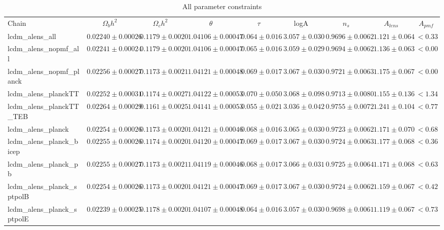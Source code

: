 \documentclass[preprint]{emulateapj}
\begin{document}
\begin{table*}[htb]
\begin{center}
\caption{\label{tab:param_all} All parameter constraints}
\tiny
\begin{tabular}{l || c c c c c c c | c}
Chain & $\Omega_b h^2$  & $\Omega_c h^2$  & $\theta$  & $\tau$  & logA  & $n_s$  & $A_{lens}$  & $A_{pmf}$ \\
lcdm\_alens\_all & $ 0.02240\pm  0.00026$ & $ 0.1179\pm  0.0020$ & $ 1.04106\pm  0.00047$ & $ 0.064\pm  0.016$ & $ 3.057\pm  0.030$ & $ 0.9696\pm  0.0062$ & $ 1.121 \pm  0.064$ & $< 0.33$ \\
lcdm\_alens\_nopmf\_all & $ 0.02241\pm  0.00024$ & $ 0.1179\pm  0.0020$ & $ 1.04106\pm  0.00047$ & $ 0.065\pm  0.016$ & $ 3.059\pm  0.029$ & $ 0.9694\pm  0.0062$ & $ 1.136 \pm  0.063$ & $< 0.00$ \\
lcdm\_alens\_nopmf\_planck & $ 0.02256\pm  0.00027$ & $ 0.1173\pm  0.0021$ & $ 1.04121\pm  0.00048$ & $ 0.069\pm  0.017$ & $ 3.067\pm  0.030$ & $ 0.9721\pm  0.0063$ & $ 1.175 \pm  0.067$ & $< 0.00$ \\
lcdm\_alens\_planckTT & $ 0.02252\pm  0.00031$ & $ 0.1174\pm  0.0027$ & $ 1.04122\pm  0.00053$ & $ 0.070\pm  0.050$ & $ 3.068\pm  0.098$ & $ 0.9713\pm  0.0080$ & $ 1.155 \pm  0.136$ & $< 1.34$ \\
lcdm\_alens\_planckTT\_TEB & $ 0.02264\pm  0.00029$ & $ 0.1161\pm  0.0025$ & $ 1.04141\pm  0.00053$ & $ 0.055\pm  0.021$ & $ 3.036\pm  0.042$ & $ 0.9755\pm  0.0072$ & $ 1.241 \pm  0.104$ & $< 0.77$ \\
lcdm\_alens\_planck & $ 0.02254\pm  0.00026$ & $ 0.1173\pm  0.0020$ & $ 1.04121\pm  0.00046$ & $ 0.068\pm  0.016$ & $ 3.065\pm  0.030$ & $ 0.9723\pm  0.0062$ & $ 1.171 \pm  0.070$ & $< 0.68$ \\
lcdm\_alens\_planck\_bicep & $ 0.02255\pm  0.00026$ & $ 0.1174\pm  0.0020$ & $ 1.04120\pm  0.00047$ & $ 0.069\pm  0.017$ & $ 3.067\pm  0.030$ & $ 0.9724\pm  0.0063$ & $ 1.177 \pm  0.068$ & $< 0.36$ \\
lcdm\_alens\_planck\_pb & $ 0.02255\pm  0.00027$ & $ 0.1173\pm  0.0021$ & $ 1.04119\pm  0.00046$ & $ 0.068\pm  0.017$ & $ 3.066\pm  0.031$ & $ 0.9725\pm  0.0064$ & $ 1.171 \pm  0.068$ & $< 0.63$ \\
lcdm\_alens\_planck\_sptpolB & $ 0.02254\pm  0.00026$ & $ 0.1173\pm  0.0020$ & $ 1.04121\pm  0.00047$ & $ 0.069\pm  0.017$ & $ 3.067\pm  0.030$ & $ 0.9724\pm  0.0062$ & $ 1.159 \pm  0.067$ & $< 0.42$ \\
lcdm\_alens\_planck\_sptpolE & $ 0.02239\pm  0.00025$ & $ 0.1178\pm  0.0020$ & $ 1.04107\pm  0.00048$ & $ 0.064\pm  0.016$ & $ 3.057\pm  0.030$ & $ 0.9698\pm  0.0061$ & $ 1.119 \pm  0.067$ & $< 0.73$ \\

\end{tabular}
\end{center}
\end{table*}
\end{document}
